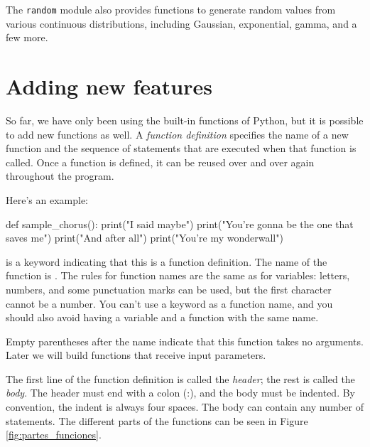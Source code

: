 The \texttt{random} module also provides functions to generate random values from various continuous distributions, including Gaussian, exponential, gamma, and a few more.

\hypertarget{auxf1adiendo-funciones-nuevas}{%
\section{Adding new features}\label{auxf1adiendo-funciones-nuevas}}

So far, we have only been using the built-in functions of Python, but it is possible to add new functions as well. A \emph{function definition} specifies the name of a new function and the sequence of statements that are executed when that function is called. Once a function is defined, it can be reused over and over again throughout the program.

  

Here's an example:

\begin{python}[frame=single]
def sample_chorus():
    print("I said maybe")
    print("You're gonna be the one that saves me")
    print("And after all")
    print("You're my wonderwall")
\end{python}

 is a keyword indicating that this is a function definition. The name of the function is . The rules for function names are the same as for variables: letters, numbers, and some punctuation marks can be used, but the first character cannot be a number. You can't use a keyword as a function name, and you should also avoid having a variable and a function
with the same name.

  

Empty parentheses after the name indicate that this function takes no arguments. Later we will build functions that receive input parameters.

  
 

The first line of the function definition is called the \emph{header}; the rest is called the \emph{body}. The header must end with a colon (:), and the body must be indented. By convention, the indent is always four spaces. The body can contain any number of statements. The different parts of the functions can be seen in Figure \ref{fig:partes_funciones}.

